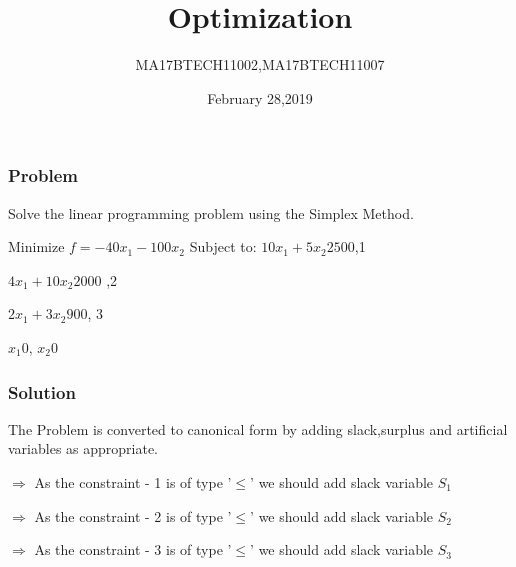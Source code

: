 \documentclass{beamer}
\title[Short title]{Optimization } %
\author{MA17BTECH11002,MA17BTECH11007} %
\institute[IITH] %
{
Simplex Method \\ %
\medskip
\textit{Problem 3} %
}
\date{February 28,2019} %
\begin{document}
\begin{frame}
\titlepage %
\end{frame}

\begin{frame}
\frametitle{Problem}

Solve the linear programming problem using the Simplex Method.\newline

Minimize $ f = -40x_{1}-100x_{2}$\newline\newline
Subject to:\newline\newline
\centering 
$10x_{1}+5x_{2} $\leq$ 2500$,\quad \quad \quad \quad \textcircled{1}\newline

$4x_{1}+10x_{2} $\leq$ 2000$ ,\quad \quad \quad \quad \textcircled{2}\newline

$2x_{1}+3x_{2} $\leq$ 900$, \quad \quad \quad \quad \quad \textcircled{3}\newline

$x_{1}$\geq$0$,
$x_{2}$\geq$0$


\end{frame}


\begin{frame}
\frametitle{Solution}
The Problem is converted to canonical form by adding slack,surplus and artificial variables as appropriate.\newline

$\Rightarrow$ As the constraint - 1 is of type '$\leq$' we should add slack variable $S_{1}$ \newline

$\Rightarrow$ As the constraint - 2 is of type '$\leq$' we should add slack variable $S_{2}$\newline

$\Rightarrow$ As the constraint - 3 is of type '$\leq$' we should add slack variable $S_{3}$\newline

\end{frame}
\end{document}
